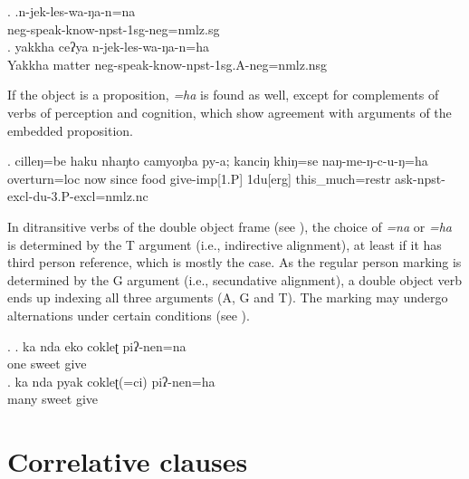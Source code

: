 \ex. \ag.n-jek-les-wa-ŋa-n=na\\
		{\sc neg}-speak-know{\sc -npst-1sg-neg=nmlz.sg} 	\\
 	\bg. yakkha ceʔya n-jek-les-wa-ŋa-n=ha\\
	Yakkha matter {\sc neg}-speak-know{\sc -npst-1sg.A-neg=nmlz.nsg} 		\\
	
	
If the object is a proposition, \emph{=ha} is found as well, except for complements of verbs of perception and cognition, which show agreement with arguments of the embedded proposition.


\exg. cilleŋ=be     haku nhaŋto camyoŋba py-a;  kanciŋ khiŋ=se   naŋ-me-ŋ-c-u-ŋ=ha\\
 overturn{\sc =loc} now since   food give{\sc -imp[1.P]} {\sc 1du[erg]} this\_much{\sc =restr} ask{\sc -npst-excl-du-3.P-excl=nmlz.nc}\\
  	

   
In ditransitive verbs of the double object frame (see ), the choice of \emph{=na} or \emph{=ha}  is determined by the T argument (i.e., indirective alignment), at least if it has third person reference, which is mostly the case. As the regular person marking is determined by the G argument (i.e., secundative alignment), a double object verb ends up indexing all three arguments (A, G and T). The marking may undergo alternations under certain conditions (see ).


 \ex. \ag. ka nda eko cokleʈ piʔ-nen=na\\
			  one sweet give\\
			\bg. ka nda pyak cokleʈ(=ci) piʔ-nen=ha\\
			  many sweet give\\



\section{Correlative clauses}\label{correlative}


